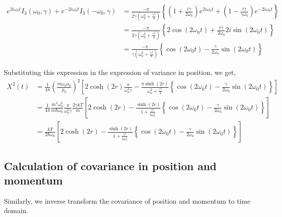 \documentclass[12pt, twoside]{article}
\begin{document}
$\begin{aligned}e^{2i\omega_0 t}I_3(\omega_0,\gamma) + e^{-2i\omega_0 t}I_3(-\omega_0,\gamma) & = \frac{-\pi}{2\gamma(\omega_0^2 + \frac{\gamma^2}{4})}\left\{\left( 1 + \frac { i \gamma } { 2 \omega _ { 0 } } \right) e ^ { 2 i \omega _ { 0 } t } + \left( 1 - \frac { i \gamma } { \gamma \omega _ { 0 } } \right) e ^ { - 2 i \omega _ { 0 } t }\right\} \\ & = \frac{-\pi}{2\gamma(\omega_0^2 + \frac{\gamma^2}{4})} \left\{2\cos(2\omega_0 t) + \frac{i\gamma}{2 \omega_0} 2 i \sin(2\omega_0 t)\right\} \\&= \frac{-\pi}{\gamma(\omega_0^2 + \frac{\gamma^2}{4})} \left\{\cos(2\omega_0 t) - \frac{\gamma}{2 \omega_0} \sin(2\omega_0 t)\right\}  \end{aligned}$

Substituting this expression in the expression of variance in position, we get,
\begin{equation}\begin{aligned}\label{eq:x_average}
\overline{X ^ { 2 } ( t )} &= \frac{1}{4\pi}\left(\frac { m \omega _ { 0 } a_0 } { p _ { 0 } }\right)^2 \left[2\cosh(2r)\frac{\pi}{\omega_0 ^2 \gamma} - \frac{\pi\sinh(2r)}{\omega_0 ^2+ \frac{\gamma^2}{4}}\left\{\cos(2\omega_0 t) - \frac{\gamma}{2 \omega_0}\sin(2\omega_0 t)\right\}\right] \\& = \frac{1}{4\pi} \frac{m^2 \omega_0^2}{m \hbar \omega_0} \frac{\pi}{\omega_0 ^2 \gamma} \frac{2\gamma k T}{m} \left[2\cosh(2r) - \frac{\sinh(2r)}{1 + \frac{\gamma^2}{4\omega_0 ^2}}\left\{\cos(2\omega_0 t) - \frac{\gamma}{2 \omega_0}\sin(2\omega_0 t)\right\}\right] \\& = \frac{kT}{2 \hbar \omega_0} \left[2\cosh(2r) - \frac{\sinh(2r)}{1 + \frac{\gamma^2}{4\omega_0 ^2}}\left\{\cos(2\omega_0 t) - \frac{\gamma}{2 \omega_0}\sin(2\omega_0 t)\right\}\right]
\end{aligned}\end{equation}
\subsection{Calculation of covariance in position and momentum}
Similarly, we inverse transform the covariance of position and momentum to time domain. 
\end{document}
